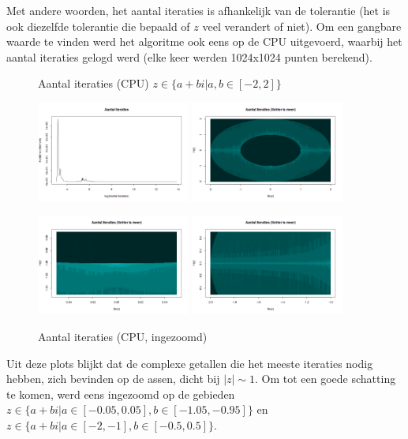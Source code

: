 \documentclass{article}
\begin{document}
Met andere woorden, het aantal iteraties is afhankelijk van de tolerantie (het is ook diezelfde tolerantie die bepaald of $z$ veel verandert of niet). Om een gangbare waarde te vinden werd het algoritme ook eens op de CPU uitgevoerd, waarbij het aantal iteraties gelogd werd (elke keer werden 1024x1024 punten berekend).
\begin{figure}[!htb]
 \caption{Aantal iteraties (CPU) $z \in \{ a + bi | a, b \in [ -2, 2 ] \}$}
 \includegraphics[width=0.45\textwidth]{figures/gl-iteraties}
 \includegraphics[width=0.45\textwidth]{figures/glit-complex}
 \caption{Aantal iteraties (CPU, ingezoomd)}
 \includegraphics[width=0.45\textwidth]{figures/zoomed_itcomplex}
 \includegraphics[width=0.45\textwidth]{figures/semizoomed}
\end{figure}
Uit deze plots blijkt dat de complexe getallen die het meeste iteraties nodig hebben, zich bevinden op de assen, dicht bij $\left|z\right| \sim 1$. Om tot een goede schatting te komen, werd eens ingezoomd op de gebieden $z \in \{a + bi | a \in [ -0.05, 0.05 ], b \in [ -1.05, -0.95 ]\}$ en $z \in \{ a + bi | a \in [ -2, -1 ], b \in [ -0.5, 0.5 ]\}$.
\end{document}

